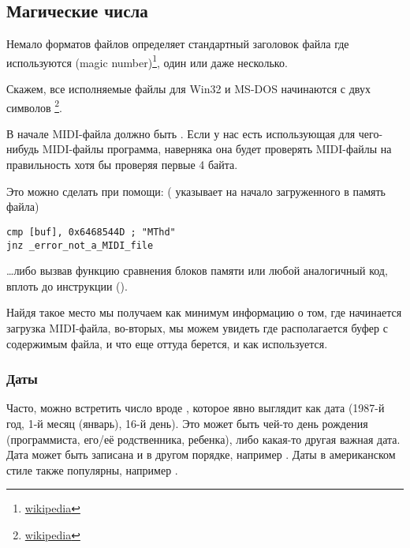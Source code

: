 \subsection{Магические числа}
\label{magic_numbers}

\newcommand{\FNURLMAGIC}{\footnote{\href{http://go.yurichev.com/17112}{wikipedia}}}

Немало форматов файлов определяет стандартный заголовок файла где используются  (magic number)\FNURLMAGIC{}, один или даже несколько.

Скажем, все исполняемые файлы для Win32 и MS-DOS начинаются с двух символов \footnote{\href{http://go.yurichev.com/17113}{wikipedia}}.

В начале MIDI-файла должно быть . Если у нас есть использующая для чего-нибудь MIDI-файлы программа,
наверняка она будет проверять MIDI-файлы на правильность хотя бы проверяя первые 4 байта.

Это можно сделать при помощи:
( указывает на начало загруженного в память файла)

\begin{lstlisting}[style=customasmx86]
cmp [buf], 0x6468544D ; "MThd"
jnz _error_not_a_MIDI_file
\end{lstlisting}

\dots либо вызвав функцию сравнения блоков памяти  или любой аналогичный код, 
вплоть до инструкции  ().

Найдя такое место мы получаем как минимум информацию о том, где начинается загрузка MIDI-файла, во-вторых, 
мы можем увидеть где располагается буфер с содержимым файла, и что еще оттуда берется, и как используется.

\subsubsection{Даты}


Часто, можно встретить число вроде , которое явно выглядит как дата (1987-й год, 1-й месяц (январь), 16-й день).
Это может быть чей-то день рождения (программиста, его/её родственника, ребенка), либо какая-то другая важная дата.
Дата может быть записана и в другом порядке, например .
Даты в американском стиле также популярны, например .

